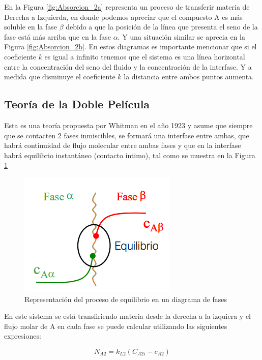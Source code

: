 \documentclass[11pt]{book}
\begin{document}
En la Figura \ref{fig:Absorcion_2a} representa un proceso de transferir materia de Derecha a Izquierda, en donde podemos apreciar que el compuesto A es más soluble en la fase $\beta$ debido a que la posición de la línea que presenta el seno de la fase está más arriba que en la fase $\alpha$. Y una situación similar se aprecia en la Figura \ref{fig:Absorcion_2b}. En estos diagramas es importante mencionar que si el coeficiente $k$ es igual a infinito tenemos que el sistema es una línea horizontal entre la concentración del seno del fluido y la concentración de la interfase. Y a medida que disminuye el coeficiente $k$ la distancia entre ambos puntos aumenta.

\subsection{Teoría de la Doble Película}

Esta es una teoría propuesta por Whitman en el año 1923 y asume que siempre que se contacten 2 fases inmiscibles, se formará una interfase entre ambas, que habrá continuidad de flujo molecular entre ambas fases y que en la interfase habrá equilibrio instantáneo (contacto íntimo), tal como se muestra en la Figura \ref{fig:Absorcion_3}

\begin{figure}[H]
    \centering
    \includegraphics{img/absorcion/Absorcion_3.PNG}
    \caption{Representación del proceso de equilibrio en un diagrama de fases}
    \label{fig:Absorcion_3}
\end{figure}

En este sistema se está transfiriendo materia desde la derecha a la izquiera y el flujo molar de A en cada fase se puede calcular utilizando las siguientes expresiones:

\begin{equation}
    \label{eq:Absorcion_12}
    N_{A2} = k_{L2} (C_{A2i} - c_{A2})
\end{equation}
\end{document}
